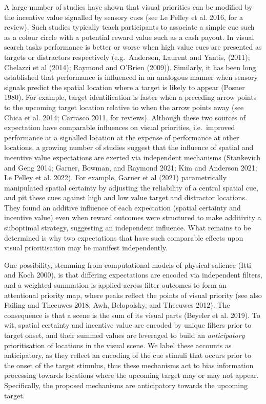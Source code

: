 \documentclass[11pt,halfline,a4paper,]{ouparticle}
\begin{document}
A large number of studies have shown that visual priorities can be modified by the incentive value signalled by sensory cues (see Le Pelley et al. 2016, for a review). Such studies typically teach participants to associate a simple cue such as a colour circle with a potential reward value such as a cash payout. In visual search tasks performance is better or worse when high value cues are presented as targets or distractors respectively (e.g.~Anderson, Laurent and Yantis, (2011); Chelazzi et al (2014); Raymond and O'Brien (2009)). Similarly, it has been long established that performance is influenced in an analogous manner when sensory signals predict the spatial location where a target is likely to appear (Posner 1980). For example, target identification is faster when a preceding arrow points to the upcoming target location relative to when the arrow points away (see Chica et al. 2014; Carrasco 2011, for reviews). Although these two sources of expectation have comparable influences on visual priorities, i.e.~improved performance at a signalled location at the expense of performance at other locations, a growing number of studies suggest that the influence of spatial and incentive value expectations are exerted via independent mechanisms (Stankevich and Geng 2014; Garner, Bowman, and Raymond 2021; Kim and Anderson 2021; Le Pelley et al. 2022). For example, Garner et al (2021) parametrically manipulated spatial certainty by adjusting the reliability of a central spatial cue, and pit these cues against high and low value target and distractor locations. They found an additive influence of each expectation (spatial certainty and incentive value) even when reward outcomes were structured to make additivity a suboptimal strategy, suggesting an independent influence. What remains to be determined is why two expectations that have such comparable effects upon visual prioritisation may be manifest independently.

One possibility, stemming from computational models of physical salience (Itti and Koch 2000), is that differing expectations are encoded via independent filters, and a weighted summation is applied across filter outcomes to form an attentional priority map, where peaks reflect the points of visual priority (see also Failing and Theeuwes 2018; Awh, Belopolsky, and Theeuwes 2012). The consequence is that a scene is the sum of its visual parts (Beyeler et al. 2019). To wit, spatial certainty and incentive value are encoded by unique filters prior to target onset, and their summed values are leveraged to build an \emph{anticipatory} prioritisation of locations in the visual scene. We label these accounts as anticipatory, as they reflect an encoding of the cue stimuli that occurs prior to the onset of the target stimulus, thus these mechanisms act to bias information processing towards locations where the upcoming target may or may not appear. Specifically, the proposed mechanisms are anticipatory towards the upcoming target.
\end{document}
